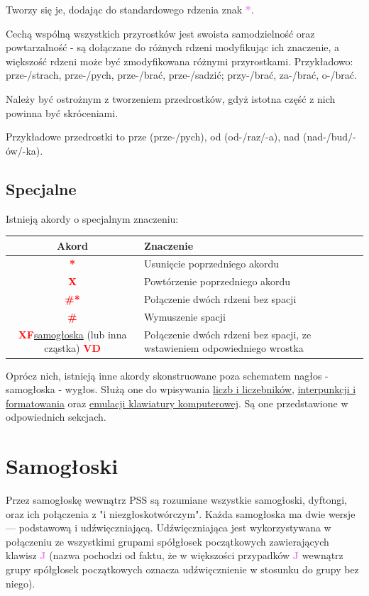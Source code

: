 \documentclass[12p, oneside]{book}
\newcommand{\steno}[1]{\textbf{\textsf{\textcolor{violet}{ #1}}}}
\newcommand{\stenoExc}[1]{\textbf{\textsf{\textcolor{red}{ #1}}}}
\begin{document}
Tworzy się je, dodając do standardowego rdzenia znak \steno{*}.

Cechą wspólną wszystkich przyrostków jest swoista samodzielność oraz
powtarzalność - są dołączane do różnych rdzeni modyfikując ich znaczenie, a
większość rdzeni może być zmodyfikowana różnymi przyrostkami. Przykładowo:
prze-/strach, prze-/pych, prze-/brać, prze-/sadzić; przy-/brać, za-/brać,
o-/brać.

Należy być ostrożnym z tworzeniem przedrostków, gdyż istotna część z nich
powinna być skróceniami.

Przykładowe przedrostki to prze (prze-/pych), od (od-/raz/-a), nad
(nad-/bud/-ów/-ka).

\newpage

\subsection{Specjalne}
Istnieją akordy o specjalnym znaczeniu:

\begin{tabular}{| c | p{6cm} |}
	\hline
	Akord & Znaczenie \\ \hline
	\stenoExc{*} & Usunięcie poprzedniego akordu \\ \hline
	\stenoExc{X} & Powtórzenie poprzedniego akordu \\ \hline
	\stenoExc{\#*} & Połączenie dwóch rdzeni bez spacji \\ \hline
	\stenoExc{\#} & Wymuszenie spacji \\ \hline
	\stenoExc{XF}\hyperref[sec:samogloski]{samogłoska} (lub inna cząstka)
	\stenoExc{VD} &
	Połączenie dwóch rdzeni bez spacji, ze wstawieniem odpowiedniego wrostka
	\\ \hline
\end{tabular}

Oprócz nich, istnieją inne akordy skonstruowane poza schematem nagłos - samogłoska - wygłos. Służą one do wpisywania \hyperref[sec:liczby]{liczb i liczebników}, \hyperref[sec:interpunkcja]{interpunkcji i formatowania} oraz \hyperref[sec:komputer]{emulacji klawiatury komputerowej}. Są one przedstawione w odpowiednich sekcjach.

\newpage

\section{Samogłoski}
\label{sec:samogloski}
Przez samogłoskę wewnątrz PSS są rozumiane wszystkie samogłoski, dyftongi, oraz
ich połączenia z "i niezgłoskotwórczym". Każda samogłoska ma dwie wersje ---
podstawową i udźwięczniającą. Udźwięczniająca jest wykorzystywana w połączeniu
ze wszystkimi grupami spółgłosek początkowych zawierających klawisz \steno{J}
(nazwa pochodzi od faktu, że w większości przypadków \steno{J} wewnątrz grupy
spółgłosek początkowych oznacza udźwięcznienie w stosunku do grupy bez niego).
\end{document}
